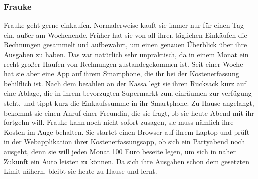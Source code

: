 \subsubsection{Frauke}

Frauke geht gerne einkaufen. Normalerweise kauft sie immer nur für einen Tag ein, außer am Wochenende. Früher hat sie von all ihren täglichen Einkäufen die Rechnungen gesammelt und aufbewahrt, um einen genauen Überblick über ihre Ausgaben zu haben. Das war natürlich sehr unpraktisch, da in einem Monat ein recht großer Haufen von Rechnungen zustandegekommen ist. Seit einer Woche hat sie aber eine App auf ihrem Smartphone, die ihr bei der Kostenerfassung behilflich ist. Nach dem bezahlen an der Kassa legt sie ihren Rucksack kurz auf eine Ablage, die in ihrem bevorzugten Supermarkt zum einräumen zur verfügung steht, und tippt kurz die Einkaufssumme in ihr Smartphone. Zu Hause angelangt, bekommt sie einen Anruf einer Freundin, die sie fragt, ob sie heute Abend mit ihr fortgehn will. Frauke kann noch nicht sofort zusagen, sie muss nämlich ihre Kosten im Auge behalten. Sie startet einen Browser auf ihrem Laptop und prüft in der Webapplikation ihrer Kostenerfassungsapp, ob sich ein Partyabend noch ausgeht, denn sie will jeden Monat 100 Euro beseite legen, um sich in naher Zukunft ein Auto leisten zu können. Da sich ihre Ausgaben schon dem gesetzten Limit nähern, bleibt sie heute zu Hause und lernt.
